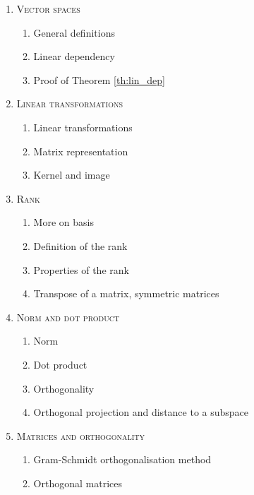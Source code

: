 \begin{enumerate}[label=\textbf{\arabic*.}]
\item \textsc{Vector spaces}
\begin{enumerate}[label=\arabic*.]
\item General definitions
\item Linear dependency
\item Proof of Theorem \ref{th:lin_dep}
\end{enumerate}
\item \textsc{Linear transformations}
\begin{enumerate}[label=\arabic*.]
\item Linear transformations
\item Matrix representation
\item Kernel and image
\end{enumerate}
\item \textsc{Rank}
\begin{enumerate}[label=\arabic*.]
\item More on basis
\item Definition of the rank
\item Properties of the rank
\item Transpose of a matrix, symmetric matrices
\end{enumerate}
\item \textsc{Norm and dot product}
\begin{enumerate}[label=\arabic*.]
\item Norm
\item Dot product
\item Orthogonality
\item Orthogonal projection and distance to a subspace
\end{enumerate}
\item \textsc{Matrices and orthogonality}
\begin{enumerate}[label=\arabic*.]
\item Gram-Schmidt orthogonalisation method
\item Orthogonal matrices
\end{enumerate}
\end{enumerate}
